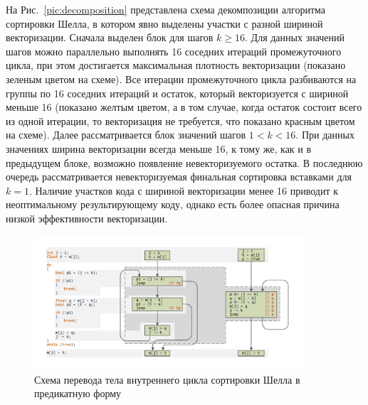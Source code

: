 \documentclass[utf8]{psta}
\begin{document}
На Рис.~\ref{pic:decomposition} представлена схема декомпозиции алгоритма сортировки Шелла, в котором явно выделены участки с разной шириной векторизации. Сначала выделен блок для шагов $k \ge 16$. Для данных значений шагов можно параллельно выполнять 16 соседних итераций промежуточного цикла, при этом достигается максимальная плотность векторизации (показано зеленым цветом на схеме). Все итерации промежуточного цикла разбиваются на группы по 16 соседних итераций и остаток, который векторизуется с шириной меньше 16 (показано желтым цветом, а в том случае, когда остаток состоит всего из одной итерации, то векторизация не требуется, что показано красным цветом на схеме). Далее рассматривается блок значений шагов $1 < k < 16$. При данных значениях ширина векторизации всегда меньше 16, к тому же, как и в предыдущем блоке, возможно появление невекторизуемого остатка. В последнюю очередь рассматривается невекторизуемая финальная сортировка вставками для $k = 1$. Наличие участков кода с шириной векторизации менее 16 приводит к неоптимальному результирующему коду, однако есть более опасная причина низкой эффективности векторизации.

\begin{figure}
\includegraphics[width=10cm]{pics/pic_shell_cfg}
\caption{Схема перевода тела внутреннего цикла сортировки Шелла в предикатную форму}
\label{pic:shell_cfg}
\end{figure}
\end{document}

